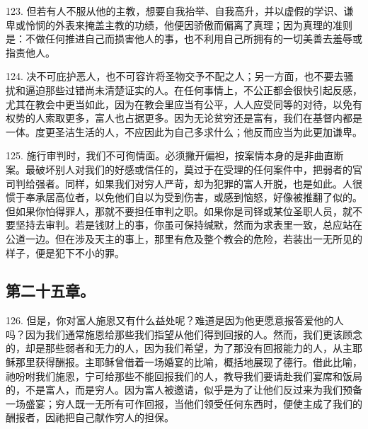 123. 但若有人不服从他的主教，想要自我抬举、自我高升，并以虚假的学识、谦卑或怜悯的外表来掩盖主教的功绩，他便因骄傲而偏离了真理；因为真理的准则是：不做任何推进自己而损害他人的事，也不利用自己所拥有的一切美善去羞辱或指责他人。\par

124. 决不可庇护恶人，也不可容许将圣物交予不配之人；另一方面，也不要去骚扰和逼迫那些过错尚未清楚证实的人。在任何事情上，不公正都会很快引起反感，尤其在教会中更当如此，因为在教会里应当有公平，人人应受同等的对待，以免有权势的人索取更多，富人也占据更多。因为无论贫穷还是富有，我们在基督内都是一体。度更圣洁生活的人，不应因此为自己多求什么；他反而应当为此更加谦卑。\par

125. 施行审判时，我们不可徇情面。必须撇开偏袒，按案情本身的是非曲直断案。最破坏别人对我们的好感或信任的，莫过于在受理的任何案件中，把弱者的官司判给强者。同样，如果我们对穷人严苛，却为犯罪的富人开脱，也是如此。人很惯于奉承居高位者，以免他们自以为受到伤害，或感到恼怒，好像被推翻了似的。但如果你怕得罪人，那就不要担任审判之职。如果你是司铎或某位圣职人员，就不要坚持去审判。若是钱财上的事，你虽可保持缄默，然而为求表里一致，总应站在公道一边。但在涉及天主的事上，那里有危及整个教会的危险，若装出一无所见的样子，便是犯下不小的罪。\par


\subsection{第二十五章。}

\par

126. 但是，你对富人施恩又有什么益处呢？难道是因为他更愿意报答爱他的人吗？因为我们通常施恩给那些我们指望从他们得到回报的人。然而，我们更该顾念的，却是那些弱者和无力的人，因为我们希望，为了那没有回报能力的人，从主耶稣那里获得酬报。主耶稣曾借着一场婚宴的比喻，概括地展现了德行。借此比喻，祂吩咐我们施恩，宁可给那些不能回报我们的人，教导我们要请赴我们宴席和饭局的，不是富人，而是穷人。因为富人被邀请，似乎是为了让他们反过来为我们预备一场盛宴；穷人既一无所有可作回报，当他们领受任何东西时，便使主成了我们的酬报者，因祂把自己献作穷人的担保。\par

